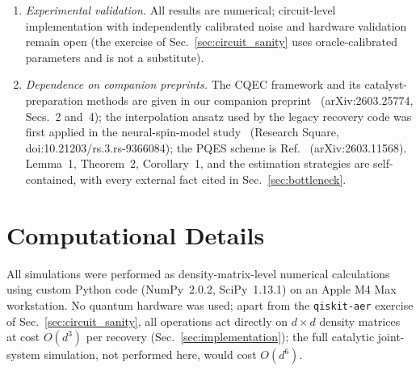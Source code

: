 \documentclass[12pt,a4paper]{article}
\begin{document}
\begin{enumerate}
In realistic multi-qubit settings, noise acts locally, and estimation strategies could exploit this locality (e.g., per-qubit coherence maximization); extending the framework to tensor-product structure is a natural next step.
\item \emph{Experimental validation.}
All results are numerical; circuit-level implementation with independently calibrated noise and hardware validation remain open (the exercise of Sec.~\ref{sec:circuit_sanity} uses oracle-calibrated parameters and is not a substitute).
\item \emph{Dependence on companion preprints.}
The CQEC framework and its catalyst-preparation methods are given in our companion preprint~\cite{Wakaura2026unified} (arXiv:2603.25774, Secs.~2 and~4); the interpolation ansatz used by the legacy recovery code was first applied in the neural-spin-model study~\cite{Wakaura2026catalyst} (Research Square, doi:10.21203/rs.3.rs-9366084); the PQES scheme is Ref.~\cite{Raghoonanan2026} (arXiv:2603.11568).
Lemma~1, Theorem~2, Corollary~1, and the estimation strategies are self-contained, with every external fact cited in Sec.~\ref{sec:bottleneck}.
\end{enumerate}


\section{Computational Details}
\label{sec:computational}

All simulations were performed as density-matrix-level numerical calculations using custom Python code (NumPy~2.0.2, SciPy~1.13.1) on an Apple M4 Max workstation.
No quantum hardware was used; apart from the \texttt{qiskit-aer} exercise of Sec.~\ref{sec:circuit_sanity}, all operations act directly on $d \times d$ density matrices at cost $O(d^3)$ per recovery (Sec.~\ref{sec:implementation}); the full catalytic joint-system simulation, not performed here, would cost $O(d^6)$.
\end{document}
